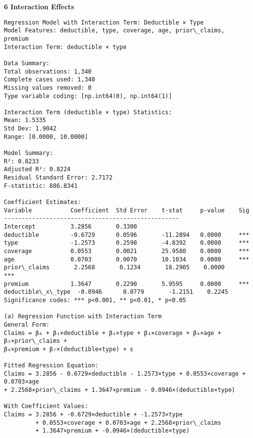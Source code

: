 \documentclass[8pt, twocolumn]{extarticle}
\begin{document}
    \textbf{6 Interaction Effects}
    \begin{Verbatim}[commandchars=\\\{\}]
Regression Model with Interaction Term: Deductible × Type
Model Features: deductible, type, coverage, age, prior\_claims, premium
Interaction Term: deductible × type

Data Summary:
Total observations: 1,340
Complete cases used: 1,340
Missing values removed: 0
Type variable coding: [np.int64(0), np.int64(1)]

Interaction Term (deductible × type) Statistics:
Mean: 1.5335
Std Dev: 1.9042
Range: [0.0000, 10.0000]

Model Summary:
R²: 0.8233
Adjusted R²: 0.8224
Residual Standard Error: 2.7172
F-statistic: 886.8341

Coefficient Estimates:
Variable           Coefficient  Std Error    t-stat     p-value    Sig
--------------------------------------------------
Intercept          3.2856       0.3300
deductible         -0.6729      0.0596       -11.2894   0.0000     ***
type               -1.2573      0.2598       -4.8392    0.0000     ***
coverage           0.0553       0.0021       25.9580    0.0000     ***
age                0.0703       0.0070       10.1034    0.0000     ***
prior\_claims       2.2568       0.1234       18.2905    0.0000     ***
premium            1.3647       0.2290       5.9595     0.0000     ***
deductible\_x\_type  -0.0946      0.0779       -1.2151    0.2245
Significance codes: *** p<0.001, ** p<0.01, * p<0.05

(a) Regression Function with Interaction Term
General Form:
Claims = β₀ + β₁×deductible + β₂×type + β₃×coverage + β₄×age + β₅×prior\_claims +
β₆×premium + β₇×(deductible×type) + ε

Fitted Regression Equation:
Claims = 3.2856 - 0.6729×deductible - 1.2573×type + 0.0553×coverage + 0.0703×age
+ 2.2568×prior\_claims + 1.3647×premium - 0.0946×(deductible×type)

With Coefficient Values:
Claims = 3.2856 + -0.6729×deductible + -1.2573×type
         + 0.0553×coverage + 0.0703×age + 2.2568×prior\_claims
         + 1.3647×premium + -0.0946×(deductible×type)
    \end{Verbatim}
\end{document}
